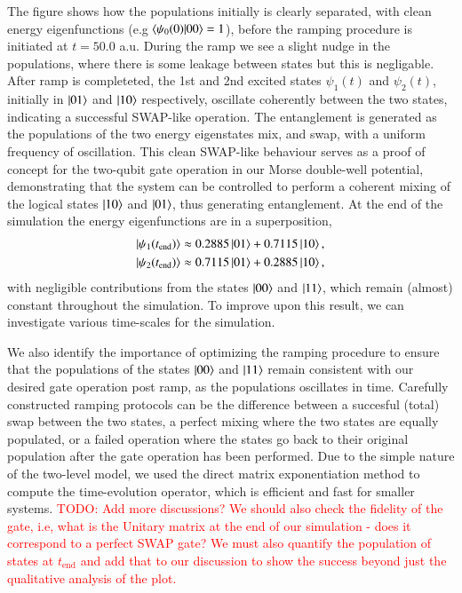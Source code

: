 \documentclass{subfiles}
\begin{document}
The figure shows how the populations initially is clearly separated, with clean energy eigenfunctions (e.g $\braket{\psi_0(0)|00} = 1$), before the ramping procedure is initiated at $t = 50.0$ a.u. During the ramp we see a slight nudge in the populations, where there is some leakage between states but this is negligable. After ramp is completeted, the 1st and 2nd excited states $\psi_1(t)$ and $\psi_2(t)$, initially in $\ket{01}$ and $\ket{10}$ respectively, oscillate coherently between the two states, indicating a successful SWAP-like operation. The entanglement is generated as the populations of the two energy eigenstates mix, and swap, with a uniform frequency of oscillation. This clean SWAP-like behaviour serves as a proof of concept for the two-qubit gate operation in our Morse double-well potential, demonstrating that the system can be controlled to perform a coherent mixing of the logical states $\ket{10}$ and $\ket{01}$, thus generating entanglement. At the end of the simulation the energy eigenfunctions are in a superposition,
\begin{align*}
    \ket{\psi_1(t_{\text{end}})} &\approx 0.2885 \ket{01} + 0.7115 \ket{10}, \\
    \ket{\psi_2(t_{\text{end}})} &\approx 0.7115 \ket{01} + 0.2885 \ket{10},
\end{align*}
with negligible contributions from the states $\ket{00}$ and $\ket{11}$, which remain (almost) constant throughout the simulation. To improve upon this result, we can investigate various time-scales for the simulation.

We also identify the importance of optimizing the ramping procedure to ensure that the populations of the states $\ket{00}$ and $\ket{11}$ remain consistent with our desired gate operation post ramp, as the populations oscillates in time. Carefully constructed ramping protocols can be the difference between a succesful (total) swap between the two states, a perfect mixing where the two states are equally populated, or a failed operation where the states go back to their original population after the gate operation has been performed. Due to the simple nature of the two-level model, we used the direct matrix exponentiation method to compute the time-evolution operator, which is efficient and fast for smaller systems. 
\textcolor{red}{TODO: Add more discussions? We should also check the fidelity of the gate, i.e, what is the Unitary matrix at the end of our simulation - does it correspond to a perfect SWAP gate? We must also quantify the population of states at $t_{\text{end}}$ and add that to our discussion to show the success beyond just the qualitative analysis of the plot.}
\end{document}
